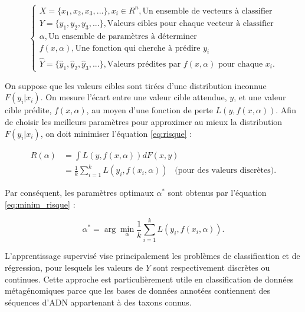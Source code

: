 \begin{equation}
    \begin{cases}
        X = \{x_1, x_2, x_3, ... \}, x_i \in R^n, \text{Un ensemble de vecteurs à classifier} \\
        Y = \{y_1, y_2, y_3, ... \}, \text{Valeurs cibles pour chaque vecteur à classifier} \\
        \alpha, \text{Un ensemble de paramètres à déterminer} \\
        f(x, \alpha), \text{Une fonction qui cherche à prédire $y_i$} \\
        \hat{Y} = \{\hat{y}_1, \hat{y}_2, \hat{y}_3, ... \}, \text{Valeurs prédites par $f(x, \alpha)$ pour chaque $x_i$}.
    \end{cases}
\end{equation}

On suppose que les valeurs cibles sont tirées d'une distribution inconnue $F(y_i | x_i)$. On mesure
l'écart entre une valeur cible attendue, $y$, et une valeur cible prédite, $f(x, \alpha)$, au moyen
d'une fonction de perte $L(y, f(x, \alpha))$. Afin de choisir les meilleurs paramètres pour
approximer au mieux la distribution $F(y_i | x_i)$, on doit minimiser l'équation \ref{eq:risque} :

\begin{equation}
    \label{eq:risque}
    \begin{split}
        R(\alpha) &= \int L(y, f(x, \alpha)) dF(x, y) \\
                  &= \frac{1}{k} \sum_{i=1}^{k} L(y_i, f(x_i, \alpha)) \;\;\; \text{(pour des valeurs discrètes)}.
    \end{split}
\end{equation}

Par conséquent, les paramètres optimaux $\alpha^*$ sont obtenus par l'équation \ref{eq:minim_risque} :

\begin{equation}
    \label{eq:minim_risque}
    \alpha^* = \arg \min_{\alpha} \frac{1}{k} \sum_{i=1}^{k} L(y_i, f(x_i, \alpha)).
\end{equation}

L'apprentissage supervisé vise principalement les problèmes de classification et de régression, pour
lesquels les valeurs de $Y$ sont respectivement discrètes ou continues. Cette approche est
particulièrement utile en classification de données métagénomiques parce que les bases de données
annotées contiennent des séquences d'ADN appartenant à des taxons connus.

